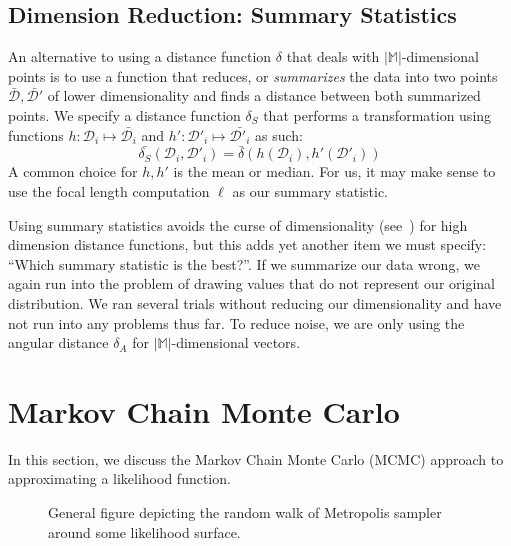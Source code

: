 \subsection{Dimension Reduction: Summary Statistics}\label{subsec:dimensionReductionSummaryStatistics}
An alternative to using a distance function $\delta$ that deals with $| \mathbb{M} |$-dimensional points is to use a
function that reduces, or \emph{summarizes} the data into two points $\bar{\mathcal{D}}, \bar{\mathcal{D}'}$ of lower
dimensionality and finds a distance between both summarized points.
We specify a distance function $\delta_S$ that performs a transformation using functions
$h : \mathcal{D}_i \mapsto \bar{\mathcal{D}_i}$ and $h' : \mathcal{D}'_i \mapsto \bar{\mathcal{D}'_i}$ as such:
\begin{equation}
    \bar{\delta_S}(\mathcal{D}_i, \mathcal{D}'_i)  = \bar{\delta}(h(\mathcal{D}_i), h'(\mathcal{D}'_i))
\end{equation}
A common choice for $h, h'$ is the mean or median.
For us, it may make sense to use the focal length computation $\hat{\ell}$ as our summary statistic.

Using summary statistics avoids the curse of dimensionality (see~\cite{bellmanDynamicProgramming2013}) for high
dimension distance functions, but this adds yet another item we must specify: ``Which summary statistic is the best?''.
If we summarize our data wrong, we again run into the problem of drawing values that do not represent our original
distribution.
We ran several trials without reducing our dimensionality and have not run into any problems thus far.
To reduce noise, we are only using the angular distance $\delta_A$ for $| \mathbb{M} |$-dimensional vectors.

\section{Markov Chain Monte Carlo}\label{sec:markovChainMonteCarlo}
In this section, we discuss the Markov Chain Monte Carlo (MCMC) approach to approximating a likelihood function.

\begin{figure}[t]
    \centering{}
    \caption{General figure depicting the random walk of Metropolis sampler around some likelihood surface.
    }\label{fig:metropolisAlgorithm}
\end{figure}

